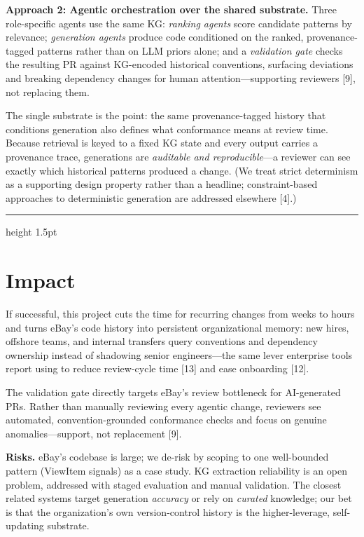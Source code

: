 \documentclass[11pt, letterpaper]{article}
\newcommand{\ehr}{{\color{gray!60}\hrule height 1.5pt}}
\begin{document}
\textbf{Approach 2: Agentic orchestration over the shared substrate.} Three role-specific agents use the same KG: \textit{ranking agents} score candidate patterns by relevance; \textit{generation agents} produce code conditioned on the ranked, provenance-tagged patterns rather than on LLM priors alone; and a \textit{validation gate} checks the resulting PR against KG-encoded historical conventions, surfacing deviations and breaking dependency changes for human attention---supporting reviewers [9], not replacing them.

The single substrate is the point: the same provenance-tagged history that conditions generation also defines what conformance means at review time. Because retrieval is keyed to a fixed KG state and every output carries a provenance trace, generations are \emph{auditable and reproducible}---a reviewer can see exactly which historical patterns produced a change. (We treat strict determinism as a supporting design property rather than a headline; constraint-based approaches to deterministic generation are addressed elsewhere [4].)

\ehr

\section*{Impact}
\label{sec:impact}

If successful, this project cuts the time for recurring changes from weeks to hours and turns eBay's code history into persistent organizational memory: new hires, offshore teams, and internal transfers query conventions and dependency ownership instead of shadowing senior engineers---the same lever enterprise tools report using to reduce review-cycle time [13] and ease onboarding [12].

The validation gate directly targets eBay's review bottleneck for AI-generated PRs. Rather than manually reviewing every agentic change, reviewers see automated, convention-grounded conformance checks and focus on genuine anomalies---support, not replacement [9].

\textbf{Risks.} eBay's codebase is large; we de-risk by scoping to one well-bounded pattern (ViewItem signals) as a case study. KG extraction reliability is an open problem, addressed with staged evaluation and manual validation. The closest related systems target generation \emph{accuracy} or rely on \emph{curated} knowledge; our bet is that the organization's own version-control history is the higher-leverage, self-updating substrate.
\end{document}
